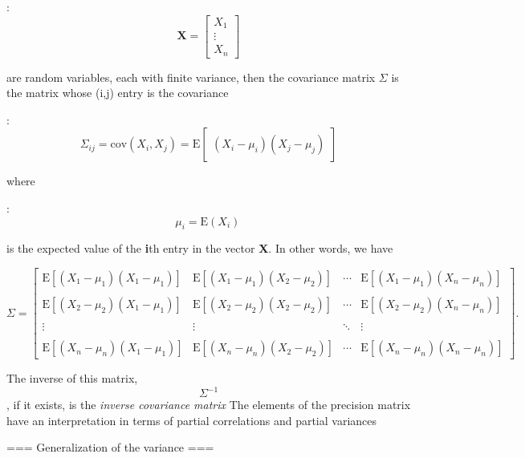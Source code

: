 :\begin{equation*} \mathbf{X} = \begin{bmatrix}X_1 \\  \vdots \\ X_n \end{bmatrix}\end{equation*}

are random variables, each with finite variance, then the covariance matrix $\Sigma$ is the matrix whose (i,j) entry is the covariance

:\begin{equation*}
\Sigma_{ij}
= \mathrm{cov}(X_i, X_j) = \mathrm{E}\begin{bmatrix}
(X_i - \mu_i)(X_j - \mu_j)
\end{bmatrix}
\end{equation*}

where 

: \begin{equation*}
\mu_i = \mathrm{E}(X_i)\,
\end{equation*}

is the expected value of the \textbf{i}th entry in the vector \textbf{X}. In other words, we have

 \begin{equation*}
\Sigma
= \begin{bmatrix}
 \mathrm{E}[(X_1 - \mu_1)(X_1 - \mu_1)] & \mathrm{E}[(X_1 - \mu_1)(X_2 - \mu_2)] & \cdots & \mathrm{E}[(X_1 - \mu_1)(X_n - \mu_n)] \\ \\
 \mathrm{E}[(X_2 - \mu_2)(X_1 - \mu_1)] & \mathrm{E}[(X_2 - \mu_2)(X_2 - \mu_2)] & \cdots & \mathrm{E}[(X_2 - \mu_2)(X_n - \mu_n)] \\ \\
 \vdots & \vdots & \ddots & \vdots \\ \\
 \mathrm{E}[(X_n - \mu_n)(X_1 - \mu_1)] & \mathrm{E}[(X_n - \mu_n)(X_2 - \mu_2)] & \cdots & \mathrm{E}[(X_n - \mu_n)(X_n - \mu_n)]
\end{bmatrix}.
\end{equation*}

The inverse of this matrix, \begin{equation*}\Sigma^{-1}\end{equation*}, if it exists, is the 
\textit{inverse covariance matrix} 
The elements of the precision matrix have an interpretation in terms of partial correlations and
partial variances

=== Generalization of the variance ===

